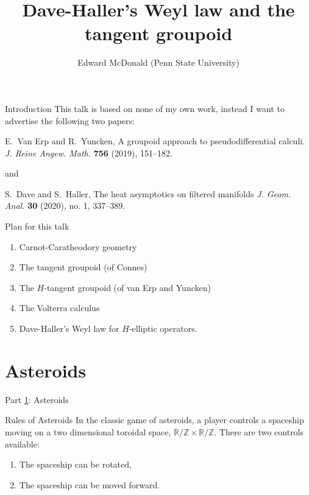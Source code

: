 \documentclass{beamer}
\newcommand\makebeamertitle{\frame{\maketitle}}%
\numberwithin{equation}{section}
\theoremstyle{plain}
\theoremstyle{plain}
\theoremstyle{definition}
\theoremstyle{plain}
\theoremstyle{plain}
\theoremstyle{definition}
\newcommand{\Rl}{\mathbb{R}}
\newcommand{\Itgr}{\mathbb{Z}}
\begin{document}
\title[Weyl law and the tangent groupoid]{Dave-Haller's Weyl law and the tangent groupoid}


\author[E. McDonald]{Edward McDonald (Penn State University)}



\makebeamertitle


\begin{frame}{Introduction}
  This talk is based on none of my own work, instead I want to advertise the following two papers:
  \begin{center}
    E.~Van Erp and R.~Yuncken, A groupoid approach to pseudodifferential calculi. \emph{J. Reine Angew. Math.} \textbf{756} (2019), 151--182.
  \end{center}
  and
  \begin{center}
    S.~Dave and S.~Haller, The heat asymptotics on filtered manifolds \emph{J. Geom. Anal.} \textbf{30} (2020), no. 1, 337--389.
  \end{center}
\end{frame}

\begin{frame}{Plan for this talk}
    \begin{enumerate}
        \item{} Carnot-Caratheodory geometry
        \item{} The tangent groupoid (of Connes)
        \item{} The $H$-tangent groupoid (of van Erp and Yuncken)
        \item{} The Volterra calculus
        \item{} Dave-Haller's Weyl law for $H$-elliptic operators.
    \end{enumerate}
\end{frame}

\section{Asteroids}\label{asteroids_section}
\begin{frame}
  \Huge{Part \ref{asteroids_section}: Asteroids}
\end{frame}

\begin{frame}{Rules of Asteroids}
  In the classic game of asteroids, a player controls a spaceship moving on a two dimensional toroidal space, $\Rl/\Itgr\times \Rl/\Itgr.$ There are two controls available:
  \begin{enumerate}[{\rm (i)}]
    \item{} The spaceship can be rotated,
    \item{} The spaceship can be moved forward.
  \end{enumerate}
\end{frame}
\end{document}
